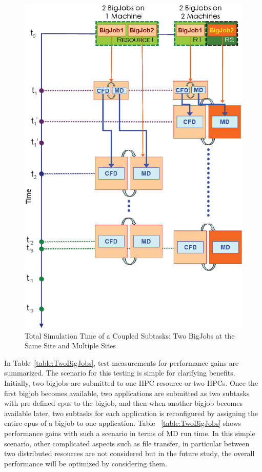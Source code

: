 \documentclass[conference,final]{IEEEtran}
\begin{document}
\begin{figure}
\centering
\includegraphics[scale=0.40]{Simulation_Time_of_Two_BigJobs.eps}
\caption{\small Total Simulation Time of a Coupled Subtasks: Two BigJobs at the Same Site and Multiple Sites}
\label{Fig:TwoBigJobs}
\end{figure}


In Table~\ref{table:TwoBigJobs}, test measurements for performance gains are summarized. The scenario for this testing is simple for clarifying benefits.  Initially, two bigjobs are submitted to one HPC resource or two HPCs.  Once the first bigjob becomes available, two applications are submitted as two subtasks with pre-defined cpus to the bigjob, and then when another bigjob becomes available later, two subtasks for each application is reconfigured by assigning the entire cpus of a bigjob to one application.  Table  ~\ref{table:TwoBigJobs} shows performance gains with such a scenario in terms of MD run time.  In this simple scenario, other complicated aspects such as file transfer, in particular between two distributed resources are not considered but in the future study, the overall performance will be optimized by considering them.
\end{document}
